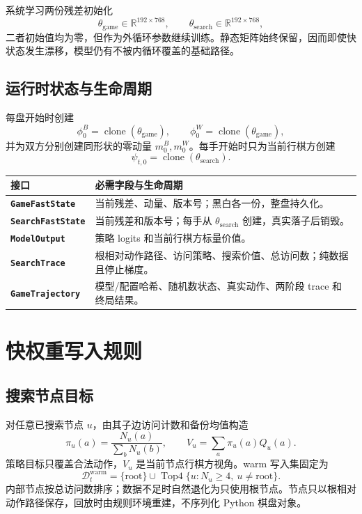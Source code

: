 \documentclass[UTF8,11pt,a4paper]{ctexart}
\newcommand{\gameinit}{\theta_{\mathrm{game}}}
\newcommand{\searchinit}{\theta_{\mathrm{search}}}
\newcommand{\code}[1]{\texttt{#1}}
\begin{document}
系统学习两份残差初始化
\[
  \gameinit\in\mathbb{R}^{192\times768},\qquad
  \searchinit\in\mathbb{R}^{192\times768},
\]
二者初始值均为零，但作为外循环参数继续训练。静态矩阵始终保留，因而即使快状态发生漂移，模型仍有不被内循环覆盖的基础路径。

\subsection{运行时状态与生命周期}

每盘开始时创建
\[
  \phi^B_0=\operatorname{clone}(\gameinit),\qquad
  \phi^W_0=\operatorname{clone}(\gameinit),
\]
并为双方分别创建同形状的零动量 $m^B_0,m^W_0$。每手开始时只为当前行棋方创建
\[
  \psi_{t,0}=\operatorname{clone}(\searchinit).
\]

\begin{center}
\begin{tabularx}{0.94\textwidth}{>{\bfseries\color{Primary}}lX}
\toprule
接口 & 必需字段与生命周期 \\
\midrule
\code{GameFastState} & 当前残差、动量、版本号；黑白各一份，整盘持久化。 \\
\code{SearchFastState} & 当前残差和版本号；每手从 $\searchinit$ 创建，真实落子后销毁。 \\
\code{ModelOutput} & 策略 logits 和当前行棋方标量价值。 \\
\code{SearchTrace} & 根相对动作路径、访问策略、搜索价值、总访问数；纯数据且停止梯度。 \\
\code{GameTrajectory} & 模型/配置哈希、随机数状态、真实动作、两阶段 trace 和终局结果。 \\
\bottomrule
\end{tabularx}
\end{center}

\section{快权重写入规则}

\subsection{搜索节点目标}

对任意已搜索节点 $u$，由其子边访问计数和备份均值构造
\[
  \pi_u(a)=\frac{N_u(a)}{\sum_bN_u(b)},\qquad
  V_u=\sum_a\pi_u(a)Q_u(a).
\]
策略目标只覆盖合法动作，$V_u$ 是当前节点行棋方视角。warm 写入集固定为
\[
  \mathcal D_t^{\mathrm{warm}}
  =\{\mathrm{root}\}\cup
  \operatorname{Top4}\{u:N_u\ge4,\ u\ne\mathrm{root}\}.
\]
内部节点按总访问数排序；数据不足时自然退化为只使用根节点。节点只以根相对动作路径保存，回放时由规则环境重建，不序列化 Python 棋盘对象。
\end{document}
